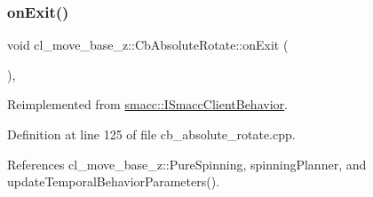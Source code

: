 \mbox{\label{classcl__move__base__z_1_1CbAbsoluteRotate_a0e362b8e9f0d7de5aeee183ba4031437}} 
\subsubsection{\texorpdfstring{on\+Exit()}{onExit()}}
{\footnotesize\ttfamily void cl\+\_\+move\+\_\+base\+\_\+z\+::\+Cb\+Absolute\+Rotate\+::on\+Exit (\begin{DoxyParamCaption}{ }\end{DoxyParamCaption})\hspace{0.3cm}{\ttfamily [override]}, {\ttfamily [virtual]}}



Reimplemented from \hyperlink{classsmacc_1_1ISmaccClientBehavior_ad1198fdb2cbdf11f3276d3e23d4c0a50}{smacc\+::\+I\+Smacc\+Client\+Behavior}.



Definition at line 125 of file cb\+\_\+absolute\+\_\+rotate.\+cpp.



References cl\+\_\+move\+\_\+base\+\_\+z\+::\+Pure\+Spinning, spinning\+Planner, and update\+Temporal\+Behavior\+Parameters().


